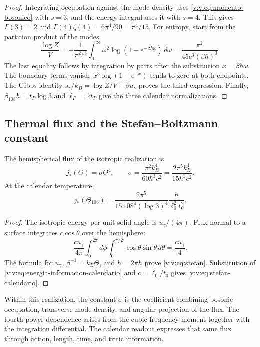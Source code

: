 \begin{proof}
Integrating occupation against the mode density uses
\eqref{v:v:eq:momento-bosonico} with \(s=3\), and the energy integral
uses it with \(s=4\). This gives \(\Gamma(3)=2\) and
\(\Gamma(4)\zeta(4)=6\pi^4/90=\pi^4/15\).
For entropy, start from the partition product of the modes:
\[
 \frac{\log Z}{V}=-\frac{1}{\pi^2c^3}
 \int_0^\infty\omega^2
 \log(1-e^{-\beta\hbar\omega})\,d\omega
 =\frac{\pi^2}{45c^3(\beta\hbar)^3}.
\]
The last equality follows by integration by parts after the substitution
\(x=\beta\hbar\omega\). The boundary terms vanish:
\(x^3\log(1-e^{-x})\) tends to zero at both endpoints.
The Gibbs identity \(s_\gamma/k_B=\log Z/V+\beta u_\gamma\)
proves the third expression. Finally,
\(\beta_{108}\hbar=t_P\log3\) and \(\ell_P=ct_P\) give the three
calendar normalizations.
\end{proof}

\subsection{Thermal flux and the Stefan--Boltzmann constant}

\begin{proposition}
\label{v:v:prop:stefan}
The hemispherical flux of the isotropic realization is
\begin{equation}
 j_*(\Theta)=\sigma\Theta^4,\qquad
 \sigma=\frac{\pi^2 k_B^4}{60\hbar^3c^2}
 =\frac{2\pi^5k_B^4}{15h^3c^2}.
 \label{v:v:eq:stefan}
\end{equation}
At the calendar temperature,
\begin{equation}
 j_*(\Theta_{108})
 =\frac{2\pi^5}{15\,108^4(\log3)^4}
 \frac{h}{\ell_0^2t_0^2}.
 \label{v:v:eq:stefan-calendario}
\end{equation}
\end{proposition}
\begin{proof}
The isotropic energy per unit solid angle is
\(u_\gamma/(4\pi)\). Flux normal to a surface integrates
\(c\cos\theta\) over the hemisphere:
\[
 \frac{cu_\gamma}{4\pi}
 \int_0^{2\pi}\!d\phi\int_0^{\pi/2}\cos\theta\sin\theta\,d\theta
 =\frac{cu_\gamma}{4}.
\]
The formula for \(u_\gamma\), \(\beta^{-1}=k_B\Theta\), and
\(h=2\pi\hbar\) prove \eqref{v:v:eq:stefan}.
Substitution of \eqref{v:v:eq:energia-informacion-calendario} and
\(c=\ell_0/t_0\) gives \eqref{v:v:eq:stefan-calendario}.
\end{proof}

Within this realization, the constant \(\sigma\) is the coefficient
combining bosonic occupation, transverse-mode density, and
angular projection of the flux. The fourth-power dependence arises from the cubic
frequency moment together with the integration differential. The calendar
readout expresses that same flux through action, length,
time, and tritic information.

